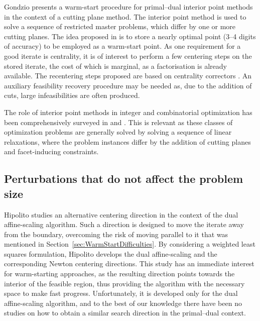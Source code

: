 Gondzio \cite{Gondzio98} presents a warm-start procedure for 
primal--dual interior point methods in the context of a cutting 
plane method. The interior 
point method is used to solve a sequence of restricted master 
problems, which differ by one or more cutting planes.
%
%
The idea proposed in \cite{Gondzio98} is to store a nearly optimal 
point (3--4 digits of accuracy) to be employed as a warm-start point.
%
%
As one requirement for a good iterate is centrality, it is of interest 
to perform a few centering steps on the stored iterate, the cost of 
which is marginal, as a factorisation is already available. The 
recentering steps proposed are based on
centrality correctors \cite{Gondzio96}.
An auxiliary feasibility recovery procedure may be needed as, due to 
the addition of cuts, large infeasibilities are often produced.

The role of interior point methods in integer and combinatorial 
optimization has been comprehensively surveyed in \cite{Mitchell96} 
and \cite{MitchellPardalosResende98}. This is relevant as these classes
of optimization problems are generally solved by solving a sequence
of linear relaxations, where the problem instances differ by the
addition of cutting planes and facet-inducing constraints.

%
%
\subsection{Perturbations that do not affect the problem size}

Hipolito \cite{Hipolito} studies an alternative centering direction 
in the context of the dual affine-scaling algorithm. Such a 
direction is designed to move the iterate away from the boundary, 
overcoming the risk of moving parallel to it that was mentioned 
in Section~\ref{sec:WarmStartDifficulties}. 
By considering a weighted least squares formulation, Hipolito 
develops the dual affine-scaling and the corresponding Newton 
centering directions. 
This study has an immediate interest for warm-starting approaches,
as the resulting direction points towards the interior of the 
feasible region, thus providing the algorithm with the necessary 
space to make fast progress. 
Unfortunately, it is developed only for the dual affine-scaling 
algorithm, and to the best of our knowledge there have been no 
studies on how to obtain a similar search direction in the 
primal--dual context.

